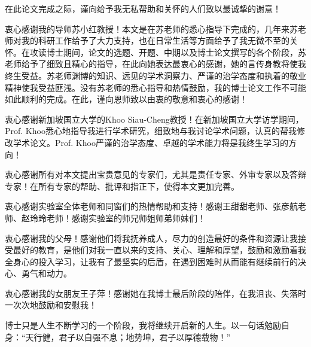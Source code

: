

在此论文完成之际，谨向给予我无私帮助和关怀的人们致以最诚挚的谢意！

衷心感谢我的导师苏小红教授！本文是在苏老师的悉心指导下完成的，几年来苏老师对我的科研工作给予了大力支持，也在日常生活等方面给予了我无微不至的关怀。在攻读博士期间，论文的选题、开题、中期以及博士论文撰写的各个阶段，苏老师给予了细致且精心的指导，在此向她表达最衷心的感谢，她的言传身教将使我终生受益。苏老师渊博的知识、远见的学术洞察力、严谨的治学态度和执着的敬业精神使我受益匪浅。没有苏老师的悉心指导和热情鼓励，我的博士论文工作不可能如此顺利的完成。在此，谨向恩师致以由衷的敬意和衷心的感谢！

衷心感谢新加坡国立大学的Khoo Siau-Cheng教授！在新加坡国立大学访学期间，Prof. Khoo悉心地指导我进行学术研究，细致地与我讨论学术问题，认真的帮我修改学术论文。Prof. Khoo严谨的治学态度、卓越的学术能力将是我终生学习的方向！

衷心感谢所有对本文提出宝贵意见的专家们，尤其是责任专家、外审专家以及答辩专家！在所有专家的帮助、批评和指正下，使得本文更加完善。

衷心感谢实验室全体老师和同窗们的热情帮助和支持！感谢王甜甜老师、张彦航老师、赵玲玲老师！感谢实验室的师兄师姐师弟师妹们！

衷心感谢我的父母！感谢他们将我抚养成人，尽力的创造最好的条件和资源让我接受最好的教育，是他们对我一直以来的支持、关心、理解和厚望，鼓励和激励着我全身心的投入学习，让我有了最坚实的后盾，在遇到困难时从而能有继续前行的决心、勇气和动力。

衷心感谢我的女朋友王子萍！感谢她在我博士最后阶段的陪伴，在我沮丧、失落时一次次地鼓励和安慰我！

博士只是人生不断学习的一个阶段，我将继续开启新的人生。以一句话勉励自身：“天行健，君子以自强不息；地势坤，君子以厚德载物！”
